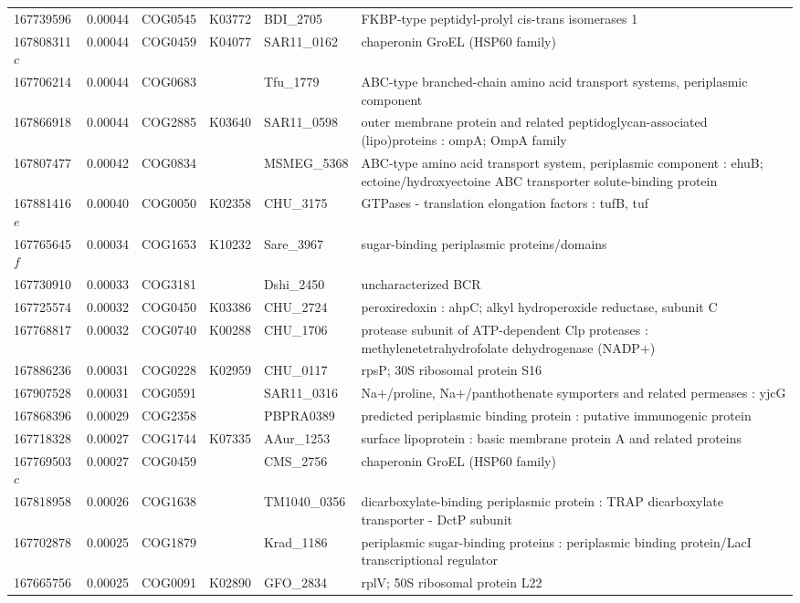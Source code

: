 \begin{landscape}
\begin{longtable}{p{1.6cm}p{1.2cm}p{1.5cm}p{1.5cm}p{2.8cm}p{13.5cm}}
167739596&0.00044&COG0545&K03772&BDI\_2705&FKBP-type peptidyl-prolyl cis-trans isomerases 1 \\
167808311$c$&0.00044&COG0459&K04077&SAR11\_0162&chaperonin GroEL (HSP60 family) \\
167706214&0.00044&COG0683&&Tfu\_1779&ABC-type branched-chain amino acid transport systems, periplasmic component \\
167866918&0.00044&COG2885&K03640&SAR11\_0598&outer membrane protein and related peptidoglycan-associated (lipo)proteins : ompA; OmpA family \\
167807477&0.00042&COG0834&&MSMEG\_5368&ABC-type amino acid transport system, periplasmic component : ehuB; ectoine/hydroxyectoine ABC  transporter solute-binding protein \\
167881416$e$&0.00040&COG0050&K02358&CHU\_3175&GTPases - translation elongation factors : tufB, tuf \\
167765645$f$&0.00034&COG1653&K10232&Sare\_3967&sugar-binding periplasmic proteins/domains \\
167730910&0.00033&COG3181&&Dshi\_2450&uncharacterized BCR \\
167725574&0.00032&COG0450&K03386&CHU\_2724&peroxiredoxin : ahpC; alkyl hydroperoxide reductase, subunit C \\
167768817&0.00032&COG0740&K00288&CHU\_1706&protease subunit of ATP-dependent Clp proteases : methylenetetrahydrofolate dehydrogenase (NADP$+$) \\
167886236&0.00031&COG0228&K02959&CHU\_0117&rpsP; 30S ribosomal protein S16 \\
167907528&0.00031&COG0591&&SAR11\_0316&Na$+$/proline, Na$+$/panthothenate symporters and related permeases : yjcG \\
167868396&0.00029&COG2358&&PBPRA0389&predicted periplasmic binding protein : putative immunogenic protein \\
167718328&0.00027&COG1744&K07335&AAur\_1253&surface lipoprotein : basic membrane protein A and related proteins \\
167769503$c$&0.00027&COG0459&&CMS\_2756&chaperonin GroEL (HSP60 family) \\
167818958&0.00026&COG1638&&TM1040\_0356&dicarboxylate-binding periplasmic protein : TRAP dicarboxylate transporter - DctP subunit \\
167702878&0.00025&COG1879&&Krad\_1186&periplasmic sugar-binding proteins : periplasmic binding protein/LacI transcriptional regulator \\
167665756&0.00025&COG0091&K02890&GFO\_2834&rplV; 50S ribosomal protein L22 \\

\end{longtable}
\end{landscape}
